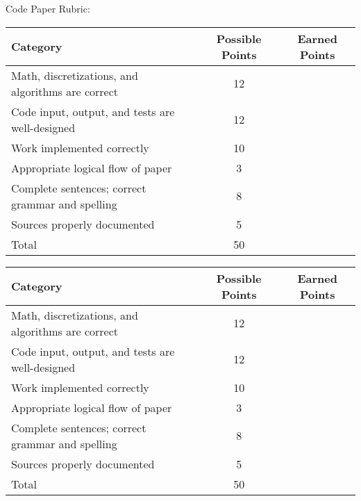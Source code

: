 \documentclass[a4paper, 12 pt]{curve}
\begin{document}

Code Paper Rubric:
\begin{center}
\begin{tabu}{| X | c | c |}\hline
\textbf{Category} & \textbf{Possible Points} & \textbf{Earned Points} \\ \hline \hline
Math, discretizations, and algorithms are correct & 12 & \\ \hline
Code input, output, and tests are well-designed & 12 & \\ \hline
Work implemented correctly & 10 & \\ \hline
Appropriate logical flow of paper & 3 & \\ \hline
Complete sentences; correct grammar and spelling & 8 & \\ \hline
Sources properly documented & 5 & \\ \hline
Total & 50 & \\\hline
\end{tabu} 
\end{center}

\vspace{2em}
\begin{center}
\begin{tabu}{| X | c | c |}\hline
\textbf{Category} & \textbf{Possible Points} & \textbf{Earned Points} \\ \hline \hline
Math, discretizations, and algorithms are correct & 12 & \\ \hline
Code input, output, and tests are well-designed & 12 & \\ \hline
Work implemented correctly & 10 & \\ \hline
Appropriate logical flow of paper & 3 & \\ \hline
Complete sentences; correct grammar and spelling & 8 & \\ \hline
Sources properly documented & 5 & \\ \hline
Total & 50 & \\\hline
\end{tabu} 
\end{center}
\end{document}
